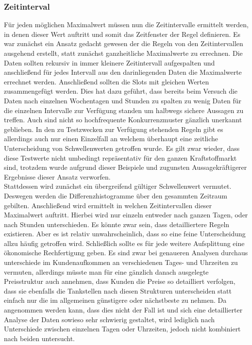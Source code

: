 \documentclass[12pt,a4paper,bibliography=totocnumbered,listof=totocnumbered]{scrartcl}
\begin{document}
\subsubsection{Zeitinterval}
Für jeden möglichen Maximalwert müssen nun die Zeitintervalle ermittelt werden, in denen dieser Wert auftritt und somit das Zeitfenster der Regel definieren. Es war zunächst ein Ansatz gedacht gewesen der die Regeln von den Zeitintervallen ausgehend erstellt, statt zunächst ganzheitliche Maximalwerte zu errechnen. Die Daten sollten rekursiv in immer kleinere Zeitintervall aufgespalten und anschließend für jedes Intervall aus den darinliegenden Daten die Maximalwerte errechnet werden. Anschließend sollten die Slots mit gleichen Werten zusammengefügt werden. Dies hat dazu geführt, dass bereits beim Versuch die Daten nach einzelnen Wochentagen und Stunden zu spalten zu wenig Daten für die einzelnen Intervalle zur Verfügung standen um halbwegs sichere Aussagen zu treffen. Auch sind nicht so hochfrequente Konkurrenzmuster gänzlich unerkannt geblieben. In den zu Testzwecken zur Verfügung stehenden Regeln gibt es allerdings auch nur einen Einzelfall an welchem überhaupt eine zeitliche Unterscheidung von Schwellenwerten getroffen wurde. Es gilt zwar wieder, dass diese Testwerte nicht umbedingt repräsentativ für den ganzen Kraftstoffmarkt sind, trotzdem wurde aufgrund dieser Beispiele und zugunsten Aussagekräftigerer Ergebnisse dieser Ansatz verworfen.\\
Stattdessen wird zunächst ein übergreifend gültiger Schwellenwert vermutet. Deswegen werden die Differenzhistogramme über den gesammten Zeitraum gebilten. Anschließend wird ermittelt in welchen Zeitintervallen dieser Maximalwert auftritt. Hierbei wird nur einzeln entweder nach ganzen Tagen, oder nach Stunden unterschieden. Es könnte zwar sein, dass detailliertere Regeln existieren. Aber es ist relativ unwahrscheinlich, dass so eine feine Unterscheidung allzu häufig getroffen wird. Schließlich sollte es für jede weitere Aufsplittung eine ökonomische Rechfertigung geben. Es sind zwar bei genaueren Analysen durchaus unterschiede im Kundenaufkommen an verschiedenen Tages- und Uhrzeiten zu vermuten, allerdings müsste man für eine gänzlich danach ausgelegte Preisstruktur auch annehmen, dass Kunden die Preise so detailliert verfolgen, dass sie ebenfalls die Tankstellen nach diesen Strukturen unterscheiden statt einfach nur die im allgemeinen günstigere oder nächstbeste zu nehmen. Da angenommen werden kann, dass dies nicht der Fall ist und sich eine detaillierter Analyse der Daten sowieso sehr schwierig gestaltet, wird lediglich nach Unterschiede zwischen einzelnen Tagen oder Uhrzeiten, jedoch nicht kombiniert nach beiden untersucht.\\
\end{document}
